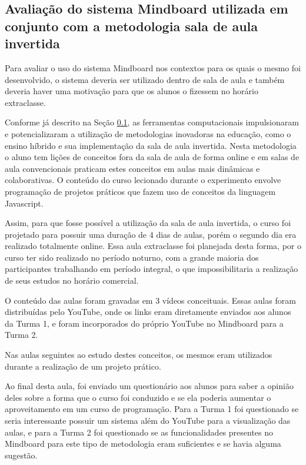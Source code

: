 \subsection{Avaliação do sistema Mindboard utilizada em conjunto com a metodologia sala de aula invertida}
\label{sec:flipped}

Para avaliar o uso do sistema Mindboard nos contextos para os quais o mesmo foi desenvolvido, o sistema deveria ser utilizado dentro de sala de aula e também deveria haver uma motivação para que os alunos o fizessem no horário extraclasse.

Conforme já descrito na Seção \ref{sec:flipped}, as ferramentas computacionais impulsionaram e potencializaram a utilização de metodologias inovadoras na educação, como o ensino híbrido e sua implementação da sala de aula invertida. Nesta metodologia o aluno tem lições de conceitos fora da sala de aula de forma online e em salas de aula convencionais praticam estes conceitos em aulas mais dinâmicas e colaborativas. O conteúdo do curso lecionado durante o 
experimento envolve programação de projetos práticos que fazem uso de conceitos da linguagem Javascript.

Assim, para que fosse possível a utilização da sala de aula invertida, o curso foi projetado para possuir uma duração de 4 dias de aulas, porém o segundo dia era realizado totalmente online. Essa aula extraclasse foi planejada desta forma, por o curso ter sido realizado no período noturno, com a grande maioria dos participantes trabalhando em período integral, o que impossibilitaria a realização de seus estudos no horário comercial.

O conteúdo das aulas foram gravadas em 3 vídeos conceituais. Essas aulas foram distribuídas pelo YouTube, onde os links eram diretamente enviados aos alunos da Turma 1, e foram incorporados do próprio YouTube no Mindboard para a Turma 2.

Nas aulas seguintes ao estudo destes conceitos, os mesmos eram utilizados durante a realização de um projeto prático.

Ao final desta aula, foi enviado um questionário aos alunos para saber a opinião deles sobre a forma que o curso foi conduzido e se ela poderia aumentar o aproveitamento em um curso de programação. Para a Turma 1 foi questionado se seria interessante possuir um sistema além do YouTube para a visualização das aulas, e para a Turma 2 foi questionado se as funcionalidades presentes no Mindboard para este tipo de metodologia eram suficientes e se havia alguma sugestão.

